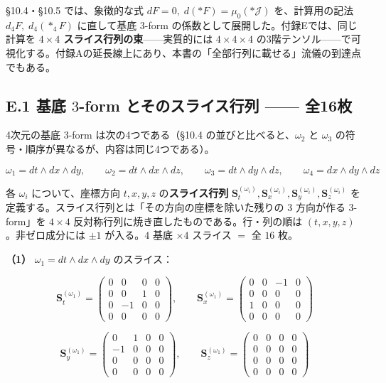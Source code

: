 \documentclass[a4paper,12pt,openany]{book}
\begin{document}
§10.4・§10.5 では、象徴的な式 \(dF=0,\;d(\ast F)=\mu_0(\ast\mathcal J)\)
を、計算用の記法 \(d_4F,\;d_4(\ast_4F)\) に直して基底 \(3\)-form
の係数として展開した。付録Eでは、同じ計算を
\textbf{$4\times4$ スライス行列の束}——実質的には \(4\times4\times4\)
の3階テンソル——で可視化する。付録Aの延長線上にあり、本書の「全部行列に載せる」流儀の到達点でもある。

\hypertarget{e.1-ux57faux5e95-3-form-ux3068ux305dux306eux30b9ux30e9ux30a4ux30b9ux884cux5217-ux516816ux679a}{%
\subsection*{\texorpdfstring{E.1 基底 \(3\)-form とそのスライス行列
——
全16枚}{E.1 基底 3-form とそのスライス行列 —— 全16枚}}\label{e.1-ux57faux5e95-3-form-ux3068ux305dux306eux30b9ux30e9ux30a4ux30b9ux884cux5217-ux516816ux679a}}

4次元の基底 \(3\)-form は次の4つである（§10.4
の並びと比べると、\(\omega_2\) と \(\omega_3\)
の符号・順序が異なるが、内容は同じ4つである）。

\[
\omega_1 = dt\wedge dx\wedge dy,\qquad
\omega_2 = dt\wedge dx\wedge dz,\qquad
\omega_3 = dt\wedge dy\wedge dz,\qquad
\omega_4 = dx\wedge dy\wedge dz
\]

各 \(\omega_i\) について、座標方向 \(t,x,y,z\) の\textbf{スライス行列}
\(\mathbf{S}_{t}^{(\omega_i)}, \mathbf{S}_{x}^{(\omega_i)}, \mathbf{S}_{y}^{(\omega_i)}, \mathbf{S}_{z}^{(\omega_i)}\)
を定義する。スライス行列とは「その方向の座標を除いた残りの \(3\)
方向が作る \(3\)-form」を \(4\times4\)
反対称行列に焼き直したものである。行・列の順は
\((t,x,y,z)\)。非ゼロ成分には \(\pm1\) が入る。\(4\) 基底 \(\times 4\)
スライス \(=\) 全 \(16\) 枚。

\textbf{（1）} \(\omega_1 = dt\wedge dx\wedge dy\) のスライス：

\[
\mathbf{S}_{t}^{(\omega_1)}=\begin{pmatrix}0&0&0&0\\[2pt]0&0&1&0\\[2pt]0&-1&0&0\\[2pt]0&0&0&0\end{pmatrix},\qquad
\mathbf{S}_{x}^{(\omega_1)}=\begin{pmatrix}0&0&-1&0\\[2pt]0&0&0&0\\[2pt]1&0&0&0\\[2pt]0&0&0&0\end{pmatrix}
\]

\[
\mathbf{S}_{y}^{(\omega_1)}=\begin{pmatrix}0&1&0&0\\[2pt]-1&0&0&0\\[2pt]0&0&0&0\\[2pt]0&0&0&0\end{pmatrix},\qquad
\mathbf{S}_{z}^{(\omega_1)}=\begin{pmatrix}0&0&0&0\\[2pt]0&0&0&0\\[2pt]0&0&0&0\\[2pt]0&0&0&0\end{pmatrix}
\]
\end{document}
